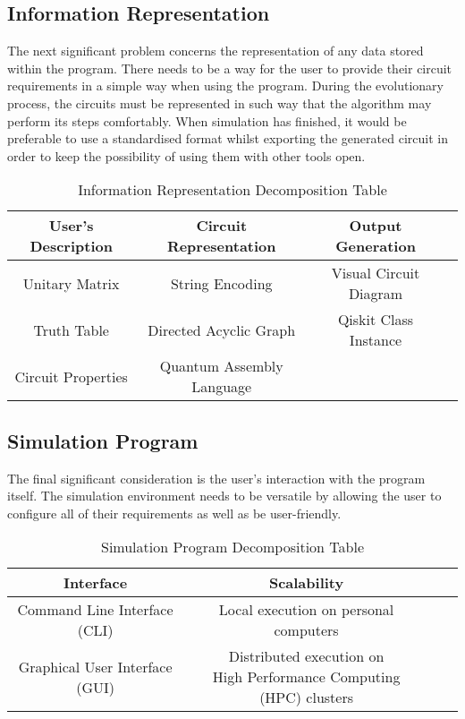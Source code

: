 \subsection{Information Representation}
The next significant problem concerns the representation of any data stored within the program. There needs to be a way for the user to provide their circuit requirements in a simple way when using the program. During the evolutionary process, the circuits must be represented in such way that the algorithm may perform its steps comfortably. When simulation has finished, it would be preferable to use a standardised format whilst exporting the generated circuit in order to keep the possibility of using them with other tools open.

\begin{table}[h!]
    \centering
    \begin{tabular}{|c|c|c|c|} 
        \hline
        \textbf{User's Description} & \textbf{Circuit Representation} & \textbf{Output Generation} \\ \hline
        Unitary Matrix & String Encoding & Visual Circuit Diagram \\ [1ex]
        Truth Table & Directed Acyclic Graph & Qiskit Class Instance \\ [1ex]
        Circuit Properties & Quantum Assembly Language & \\ [1ex]
        \hline
    \end{tabular}
    \caption{Information Representation Decomposition Table}
\end{table}

\subsection{Simulation Program}
The final significant consideration is the user's interaction with the program itself. The simulation environment needs to be versatile by allowing the user to configure all of their requirements as well as be user-friendly.

\begin{table}[h!]
    \centering
    \begin{tabular}{|c|c|c|c|} 
        \hline
        \textbf{Interface} & \textbf{Scalability} \\ \hline
        Command Line Interface (CLI) & Local execution on personal computers \\ [1ex]
        Graphical User Interface (GUI) & \makecell{Distributed execution on\\High Performance Computing (HPC) clusters} \\ [1ex]
        \hline
    \end{tabular}
    \caption{Simulation Program Decomposition Table}
\end{table}

